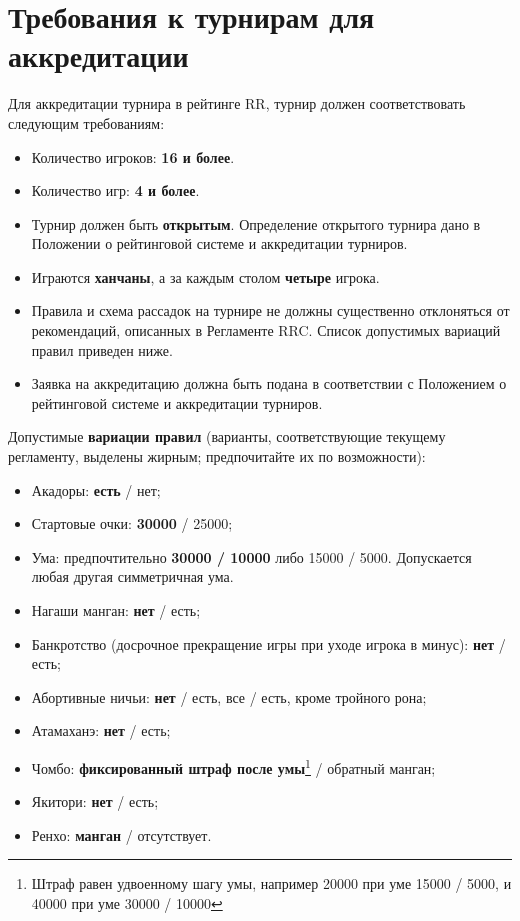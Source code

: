\section{Требования к турнирам для аккредитации}

Для аккредитации турнира в рейтинге RR, турнир должен соответствовать следующим требованиям:

\begin{itemize}
	\item Количество игроков: \textbf{16 и более}.
	\item Количество игр: \textbf{4 и более}.
	\item Турнир должен быть \textbf{открытым}. Определение открытого турнира дано в Положении о рейтинговой системе и аккредитации турниров.
	\item Играются \textbf{ханчаны}, а за каждым столом \textbf{четыре} игрока.
	\item Правила и схема рассадок на турнире не должны существенно отклоняться от рекомендаций, описанных в Регламенте RRC. Список допустимых вариаций правил приведен ниже.
	\item Заявка на аккредитацию должна быть подана в соответствии с Положением о рейтинговой системе и аккредитации турниров.
\end{itemize}

Допустимые \textbf{вариации правил} (варианты, соответствующие текущему регламенту, выделены жирным; предпочитайте их по возможности):
\begin{itemize}
	\item Акадоры: \textbf{есть} / нет;
	\item Стартовые очки: \textbf{30000} / 25000;
	\item Ума: предпочтительно \textbf{30000 / 10000} либо 15000 / 5000. Допускается любая другая симметричная ума.
	\item Нагаши манган: \textbf{нет} / есть;
	\item Банкротство (досрочное прекращение игры при уходе игрока в минус): \textbf{нет} / есть;
	\item Абортивные ничьи: \textbf{нет} / есть, все / есть, кроме тройного рона;
	\item Атамаханэ: \textbf{нет} / есть;
	\item Чомбо: \textbf{фиксированный штраф после умы}\footnote{Штраф равен удвоенному шагу умы, например 20000 при уме 15000 / 5000, и 40000 при уме 30000 / 10000} / обратный манган;
	\item Якитори: \textbf{нет} / есть;
	\item Ренхо: \textbf{манган} / отсутствует.
\end{itemize}

